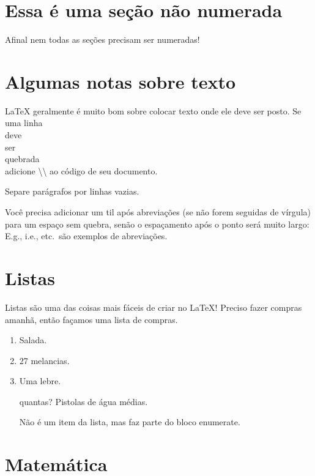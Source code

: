 \documentclass[12pt]{article}
\begin{document}
\section*{Essa é uma seção não numerada} 
Afinal nem todas as seções precisam ser numeradas!

\section{Algumas notas sobre texto}
\LaTeX{} geralmente é muito bom sobre colocar texto onde ele deve
ser posto. Se 
uma linha \\ deve \\ ser \\ quebrada \\ adicione \textbackslash\textbackslash
\hspace{1pt} ao código de seu documento. 

Separe parágrafos por linhas vazias.

Você precisa adicionar um til após abreviações (se não forem seguidas de vírgula)
para um espaço sem quebra, senão o espaçamento após o ponto será muito largo:
E.g., i.e., etc.~são exemplos de abreviações.

\section{Listas}
Listas são uma das coisas mais fáceis de criar no \LaTeX! Preciso fazer compras
amanhã, então façamos uma lista de compras.
\begin{enumerate} %
  \item Salada.
  \item 27 melancias.
  \item Uma lebre.
  \item[quantas?] Pistolas de água médias.

  Não é um item da lista, mas faz parte do bloco enumerate.

\end{enumerate} %

\section{Matemática}
\end{document}
